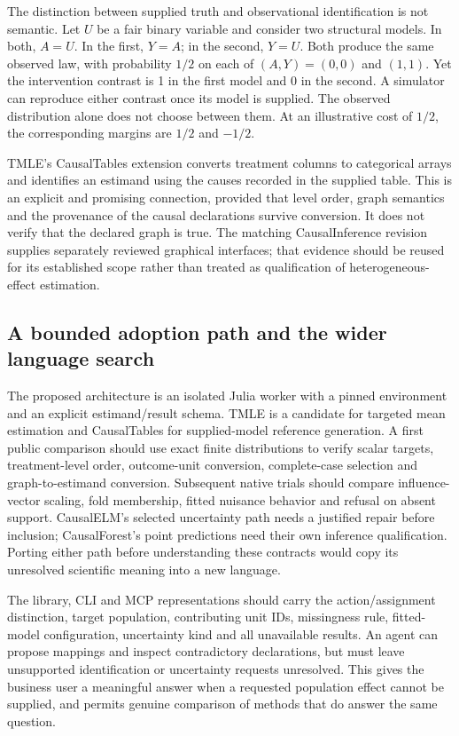 The distinction between supplied truth and observational identification is
not semantic. Let $U$ be a fair binary variable and consider two structural
models. In both, $A=U$. In the first, $Y=A$; in the second, $Y=U$. Both
produce the same observed law, with probability $1/2$ on each of
$(A,Y)=(0,0)$ and $(1,1)$. Yet the intervention contrast is 1 in the first
model and 0 in the second. A simulator can reproduce either contrast once
its model is supplied. The observed distribution alone does not choose
between them. At an illustrative cost of $1/2$, the corresponding margins
are $1/2$ and $-1/2$. \citep{exec21_effects_reference}

TMLE's CausalTables extension converts treatment columns to categorical
arrays and identifies an estimand using the causes recorded in the supplied
table. This is an explicit and promising connection, provided that level
order, graph semantics and the provenance of the causal declarations survive
conversion. It does not verify that the declared graph is true. The
matching CausalInference revision supplies separately reviewed graphical
interfaces; that evidence should be reused for its established scope rather
than treated as qualification of heterogeneous-effect estimation.
\citep{exec21_effects_tmle,exec19_otherid_julia}

\subsection{A bounded adoption path and the wider language search}
\label{exec21:effects-integration}

The proposed architecture is an isolated Julia worker with a pinned
environment and an explicit estimand/result schema. TMLE is a candidate for
targeted mean estimation and CausalTables for supplied-model reference
generation. A first public comparison should use exact finite distributions
to verify scalar targets, treatment-level order, outcome-unit conversion,
complete-case selection and graph-to-estimand conversion. Subsequent native
trials should compare influence-vector scaling, fold membership, fitted
nuisance behavior and refusal on absent support. CausalELM's selected
uncertainty path needs a justified repair before inclusion; CausalForest's
point predictions need their own inference qualification. Porting either
path before understanding these contracts would copy its unresolved
scientific meaning into a new language.

The library, CLI and MCP representations should carry the action/assignment
distinction, target population, contributing unit IDs, missingness rule,
fitted-model configuration, uncertainty kind and all unavailable results.
An agent can propose mappings and inspect contradictory declarations, but
must leave unsupported identification or uncertainty requests unresolved.
This gives the business user a meaningful answer when a requested population
effect cannot be supplied, and permits genuine comparison of methods that
do answer the same question.

